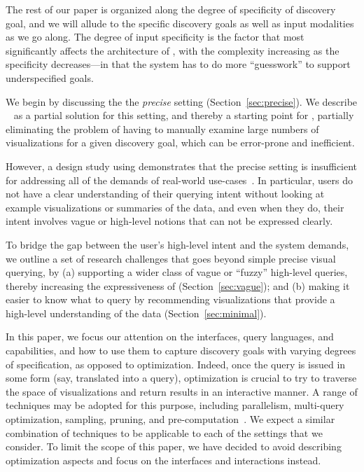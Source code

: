 \par
{}
The rest of our paper is organized along the degree of specificity
of discovery goal, and we will allude to the specific discovery
goals as well as input modalities as we go along. 
The degree of input specificity is the factor
that most significantly affects the architecture of \vida,
with the complexity increasing as the specificity decreases---in that
the system has to do more ``guesswork'' to support underspecified goals. 


\par We begin by discussing the 
the {\em precise} setting (Section~\ref{sec:precise}).
We describe \zv~\cite{Siddiqui2016} 
as a partial solution for
this setting, and thereby a starting point for \vida,
partially eliminating the problem
of having to manually examine large numbers 
of visualizations for a given discovery goal, 
which can be error-prone and inefficient.

\par However, a design study using \zv demonstrates
that the precise setting is insufficient for
addressing all of the demands of real-world use-cases~\cite{Lee2017}.
In particular, users do not have
a clear understanding of their querying intent without looking at example visualizations or summaries of the data, and even when they do, their intent involves
vague or high-level notions that can not be expressed clearly.

\par To bridge the gap between the user's high-level
intent and the system demands,
we outline a set of research challenges
that goes beyond simple precise visual querying, by
(a) supporting a wider class of vague or ``fuzzy'' high-level
queries, thereby increasing the expressiveness
of \vida (Section~\ref{sec:vague});
and 
(b) making it easier to know what to query
by recommending visualizations that provide
a high-level understanding of the data (Section~\ref{sec:minimal}).

In this paper, we focus our attention on the interfaces,
query languages, and capabilities, 
and how to use them to capture discovery goals
with varying degrees of specification, as opposed to optimization.
Indeed, once the query is issued in some form 
(say, translated into a \vidaql
query),
optimization is crucial to try to traverse the space 
of visualizations and return results in an interactive manner.
A range of techniques may be adopted for this purpose,
including parallelism, multi-query optimization, sampling,
pruning, and pre-computation~\cite{Siddiqui2016,Vartak2015}.
We expect a similar combination of techniques to be applicable to
each of the settings that we consider. To limit the scope of this paper, we have
decided to avoid describing optimization aspects and focus on the interfaces and interactions instead.


